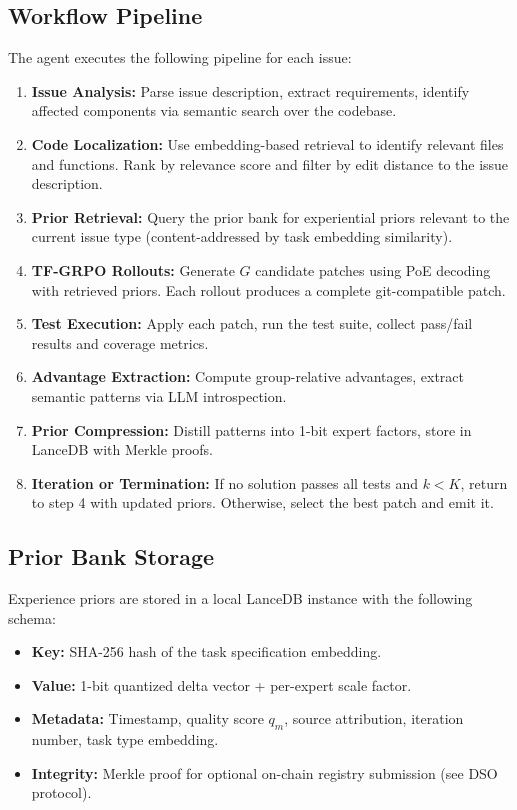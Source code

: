 \documentclass[11pt]{article}
\begin{document}
\subsection{Workflow Pipeline}

The agent executes the following pipeline for each issue:

\begin{enumerate}[leftmargin=1.5em]
    \item \textbf{Issue Analysis:} Parse issue description, extract requirements,
          identify affected components via semantic search over the codebase.
    \item \textbf{Code Localization:} Use embedding-based retrieval to identify
          relevant files and functions. Rank by relevance score and filter by
          edit distance to the issue description.
    \item \textbf{Prior Retrieval:} Query the prior bank for experiential priors
          relevant to the current issue type (content-addressed by task
          embedding similarity).
    \item \textbf{TF-GRPO Rollouts:} Generate $G$ candidate patches using PoE
          decoding with retrieved priors. Each rollout produces a complete
          git-compatible patch.
    \item \textbf{Test Execution:} Apply each patch, run the test suite, collect
          pass/fail results and coverage metrics.
    \item \textbf{Advantage Extraction:} Compute group-relative advantages,
          extract semantic patterns via LLM introspection.
    \item \textbf{Prior Compression:} Distill patterns into 1-bit expert factors,
          store in LanceDB with Merkle proofs.
    \item \textbf{Iteration or Termination:} If no solution passes all tests
          and $k < K$, return to step 4 with updated priors. Otherwise, select
          the best patch and emit it.
\end{enumerate}

\subsection{Prior Bank Storage}

Experience priors are stored in a local LanceDB instance with the following schema:
\begin{itemize}[leftmargin=1.5em]
    \item \textbf{Key:} SHA-256 hash of the task specification embedding.
    \item \textbf{Value:} 1-bit quantized delta vector + per-expert scale factor.
    \item \textbf{Metadata:} Timestamp, quality score $q_m$, source attribution,
          iteration number, task type embedding.
    \item \textbf{Integrity:} Merkle proof for optional on-chain registry
          submission (see DSO protocol).
\end{itemize}
\end{document}
